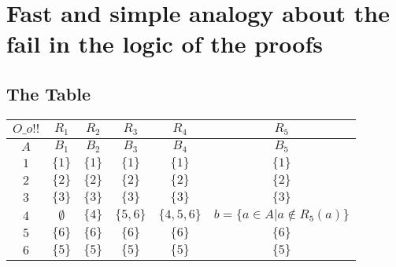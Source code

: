 \chapter{Fast and simple analogy about the fail in the logic of the proofs}
	
	\section{The Table}
	\begin{table}[h!]
		\begin{tabular}{|c|c|c|c|c|c|}
			\hline
			$O\_o!!$ & $R_{1}$ & $R_{2}$ & $R_{3}$ & $R_{4}$ & $R_{5}$ \\
			\hline
			$A$ & $B_{1}$ & $B_{2}$ & $B_{3}$ & $B_{4}$ & $B_{5}$ \\
			\hline
			\hline
			$1$ & $\{1\}$ & $\{1\}$ & $\{1\}$ & $\{1\}$ &$\{1\}$  \\
			\hline
			$2$ & $\{2\}$ & $\{2\}$ & $\{2\}$ & $\{2\}$ &$\{2\}$\\
			\hline
			$3$ & $\{3\}$ & $\{3\}$ & $\{3\}$ & $\{3\}$ &$\{3\}$\\
			\hline
			$4$ & $\emptyset$ & $\{4\}$ & $\{5,6\}$ & $\{4,5,6\}$ & $b=\{a \in A | a \notin R_{5}(a) \}$ \\
			\hline
			$5$ & $\{6\}$ & $\{6\}$ & $\{6\}$ & $\{6\}$ &$\{6\}$\\
			\hline
			$6$ & $\{5\}$ & $\{5\}$ & $\{5\}$ & $\{5\}$ &$\{5\}$ \\
			\hline 
		\end{tabular}
	\end{table}
